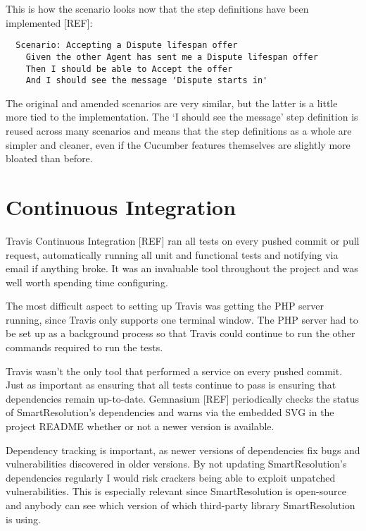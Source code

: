 This is how the scenario looks now that the step definitions have been implemented [REF]: %

\begin{lstlisting}
  Scenario: Accepting a Dispute lifespan offer
    Given the other Agent has sent me a Dispute lifespan offer
    Then I should be able to Accept the offer
    And I should see the message 'Dispute starts in'
\end{lstlisting}

The original and amended scenarios are very similar, but the latter is a little more tied to the implementation. The `I should see the message' step definition is reused across many scenarios and means that the step definitions as a whole are simpler and cleaner, even if the Cucumber features themselves are slightly more bloated than before.

\section{Continuous Integration}

Travis Continuous Integration [REF] ran all tests on every pushed commit or pull request, automatically running all unit and functional tests and notifying via email if anything broke. It was an invaluable tool throughout the project and was well worth spending time configuring.

The most difficult aspect to setting up Travis was getting the PHP server running, since Travis only supports one terminal window. The PHP server had to be set up as a background process so that Travis could continue to run the other commands required to run the tests.

Travis wasn't the only tool that performed a service on every pushed commit. Just as important as ensuring that all tests continue to pass is ensuring that dependencies remain up-to-date. Gemnasium [REF] periodically checks the status of SmartResolution's dependencies and warns via the embedded SVG in the project README whether or not a newer version is available. %

Dependency tracking is important, as newer versions of dependencies fix bugs and vulnerabilities discovered in older versions. By not updating SmartResolution's dependencies regularly I would risk crackers being able to exploit unpatched vulnerabilities. This is especially relevant since SmartResolution is open-source and anybody can see which version of which third-party library SmartResolution is using.


